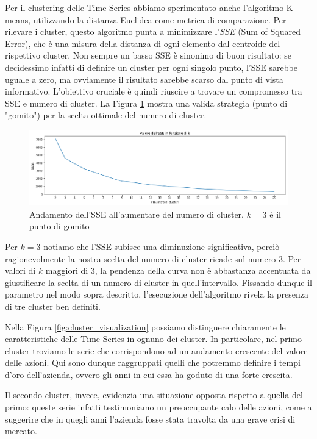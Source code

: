 \documentclass[a4paper]{article}
\begin{document}
Per il clustering delle Time Series abbiamo sperimentato anche l'algoritmo K-means, utilizzando la distanza Euclidea  come metrica di comparazione. Per rilevare i cluster, questo algoritmo punta a minimizzare l'\textit{SSE} (Sum of Squared Error), che è una misura della distanza di ogni elemento dal centroide del rispettivo cluster. Non sempre un basso SSE è sinonimo di buon risultato: se decidessimo infatti di definire un cluster per ogni singolo punto, l'SSE sarebbe uguale a zero, ma ovviamente il risultato sarebbe scarso dal punto di vista informativo. L'obiettivo cruciale è quindi riuscire a trovare un compromesso tra SSE e numero di cluster. La Figura \ref{fig:SSE_curve} mostra una valida strategia (punto di "gomito") per la scelta ottimale del numero di cluster.

\begin{figure}[h]
\includegraphics[width=\textwidth]{images/SSE_curve.png}
\caption{Andamento dell'SSE all'aumentare del numero di cluster. $k=3$ è il punto di gomito}
\label{fig:SSE_curve}
\end{figure}

Per $k=3$ notiamo che l'SSE subisce una diminuzione significativa, perciò ragionevolmente la nostra scelta del numero di cluster ricade sul numero $3$. Per valori di $k$ maggiori di 3, la pendenza della curva non è abbastanza accentuata da giustificare la scelta di un numero di cluster in quell'intervallo.
Fissando dunque il parametro nel modo sopra descritto, l'esecuzione dell'algoritmo rivela la presenza di tre cluster ben definiti. 

Nella Figura \ref{fig:cluster_visualization} possiamo distinguere chiaramente le caratteristiche delle Time Series in ognuno dei cluster. In particolare, nel primo cluster troviamo le serie che corrispondono ad un andamento crescente del valore delle azioni. Qui sono dunque raggruppati quelli che potremmo definire i tempi d'oro dell'azienda, ovvero gli anni in cui essa ha goduto di una forte crescita.

Il secondo cluster, invece, evidenzia una situazione opposta rispetto a quella del primo: queste serie infatti testimoniamo un preoccupante calo delle azioni, come a suggerire che in quegli anni l'azienda fosse stata travolta da una grave crisi di mercato.
\end{document}
